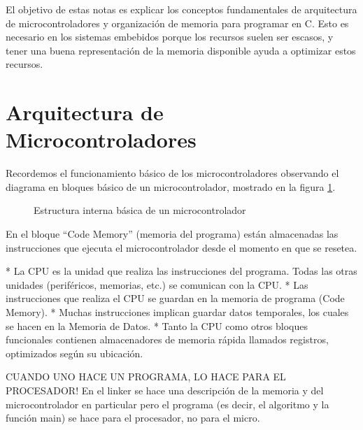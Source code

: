 \documentclass[a4 paper]{article}
\begin{document}
El objetivo de estas notas es explicar los conceptos fundamentales de arquitectura de microcontroladores y organización de memoria para programar en C. Esto es necesario en los sistemas embebidos porque los recursos suelen ser escasos, y tener una buena representación de la memoria disponible ayuda a optimizar estos recursos.

\section{Arquitectura de Microcontroladores}

Recordemos el funcionamiento básico de los microcontroladores observando el diagrama en bloques básico de un microcontrolador, mostrado en la figura \ref{fig:arq_mic}.

\begin{figure}[h!]
  \centering
  \label{fig:arq_mic}
  \caption{Estructura interna básica de un microcontrolador}
\end{figure}

En el bloque ``Code Memory'' (memoria del programa) están almacenadas las instrucciones que ejecuta el microcontrolador desde el momento en que se resetea.

* La CPU es la unidad que realiza las instrucciones del programa. Todas las otras unidades (periféricos, memorias, etc.) se comunican con la CPU.
* Las instrucciones que realiza el CPU se guardan en la memoria de programa (Code Memory).
* Muchas instrucciones implican guardar datos temporales, los cuales se hacen en la Memoria de Datos.
* Tanto la CPU como otros bloques funcionales contienen almacenadores de memoria rápida llamados registros, optimizados según su ubicación.

CUANDO UNO HACE UN PROGRAMA, LO HACE PARA EL PROCESADOR! En el linker se hace una descripción de la memoria y del microcontrolador en particular pero el programa (es decir, el algoritmo y la función main) se hace para el procesador, no para el micro.
\end{document}
